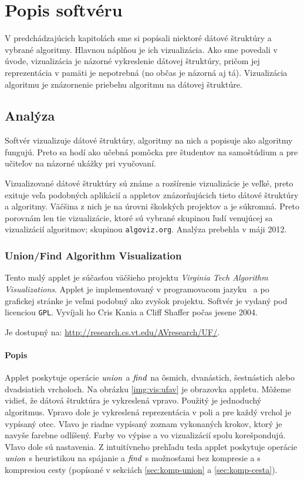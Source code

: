\chapter{Popis softvéru}\label{chap:popis}

V predchádzajúcich kapitolách sme si popísali niektoré dátové štruktúry a 
vybrané algoritmy. Hlavnou náplňou je ich vizualizácia. Ako sme povedali v 
úvode, vizualizácia je názorné vykreslenie dátovej štruktúry, pričom jej 
reprezentácia v pamäti je nepotrebná (no občas je názorná aj tá). Vizualizácia 
algoritmu je znázornenie priebehu algoritmu na dátovej štruktúre. 

\section{Analýza}

Softvér vizualizuje dátové štruktúry, algoritmy na nich a popisuje ako 
algoritmy fungujú. Preto sa hodí ako učebná pomôcka pre študentov na 
samoštúdium a pre učiteľov na názorné ukážky pri vyučovaní.

Vizualizované dátové štruktúry sú známe a rozšírenie vizualizácie je veľké, 
preto exituje veľa podobných aplikácií a appletov znázorňujúcich tieto 
dátové štruktúry a algoritmy. Väčšina z nich je na úrovni školských projektov 
a je súkromná. Preto porovnám len tie vizualizácie, ktoré sú vybrané skupinou 
ľudí venujúcej sa vizualizácií algoritmov; skupinou {\tt algoviz.org}. 
Analýza prebehla v máji 2012.

\subsection{Union/Find Algorithm Visualization}\label{sec:ufav}
Tento malý applet je súčasťou väčšieho projektu \emph{Virginia Tech Algorithm 
Visualizations}. Applet je implementovaný v programovacom jazyku \Java\ a po
grafickej stránke je veľmi podobný ako zvyšok projektu. Softvér je vydaný pod 
licenciou {\tt GPL}. Vyvíjali ho Cris Kania a Cliff Shaffer počas jesene 2004. 

Je dostupný na: \url{http://research.cs.vt.edu/AVresearch/UF/}.

\subsubsection{Popis}
Applet poskytuje operácie $\mathop{\mathit{union}}$ a $\mathop{\mathit{find}}$ na ôsmich, dvanástich, šestnástich 
alebo dvadsiatich vrcholoch. Na obrázku \ref{img:vis:ufav} je obrazovka 
appletu. Môžeme vidieť, že dátová štruktúra je vykreslená vpravo. Použitý je 
jednoduchý algoritmus. Vpravo dole je  vykreslená reprezentácia v poli a 
pre každý vrchol je vypísaný otec. Vľavo je riadne vypísaný zoznam vykonaných 
krokov, ktorý je navyše farebne odlíšený. Farby vo výpise a vo vizualizácií 
spolu korešpondujú. Vľavo dole sú nastavenia. Z intuitívneho prehľadu teda 
applet poskytuje operácie $\mathop{\mathit{union}}$ s heuristikou na spájanie a $\mathop{\mathit{find}}$ s 
možnosťami bez kompresie a s kompresiou cesty 
(popísané v sekciách \ref{sec:komp-union} a \ref{sec:komp-cesta}).

